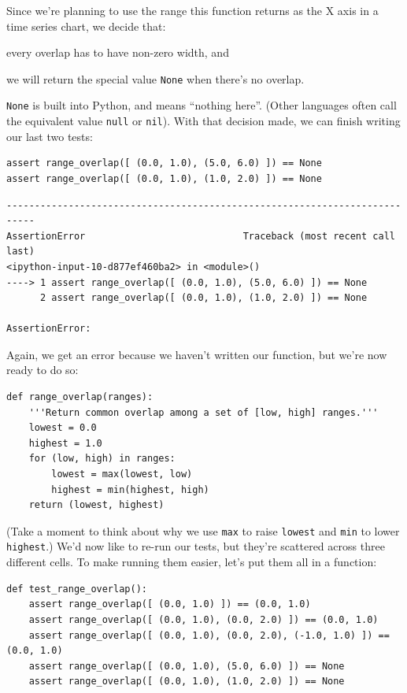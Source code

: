 \documentclass{book}
\begin{document}
Since we're planning to use the range this function returns as the X
axis in a time series chart, we decide that:

\begin{swcenumerate}
\item
  every overlap has to have non-zero width, and
\item
  we will return the special value \texttt{None} when there's no
  overlap.
\end{swcenumerate}

\texttt{None} is built into Python, and means ``nothing here''. (Other
languages often call the equivalent value \texttt{null} or
\texttt{nil}). With that decision made, we can finish writing our last
two tests:

\begin{verbatim}
assert range_overlap([ (0.0, 1.0), (5.0, 6.0) ]) == None
assert range_overlap([ (0.0, 1.0), (1.0, 2.0) ]) == None
\end{verbatim}

\begin{verbatim}
---------------------------------------------------------------------------
AssertionError                            Traceback (most recent call last)
<ipython-input-10-d877ef460ba2> in <module>()
----> 1 assert range_overlap([ (0.0, 1.0), (5.0, 6.0) ]) == None
      2 assert range_overlap([ (0.0, 1.0), (1.0, 2.0) ]) == None

AssertionError: 
\end{verbatim}

Again, we get an error because we haven't written our function, but
we're now ready to do so:

\begin{verbatim}
def range_overlap(ranges):
    '''Return common overlap among a set of [low, high] ranges.'''
    lowest = 0.0
    highest = 1.0
    for (low, high) in ranges:
        lowest = max(lowest, low)
        highest = min(highest, high)
    return (lowest, highest)
\end{verbatim}

(Take a moment to think about why we use \texttt{max} to raise
\texttt{lowest} and \texttt{min} to lower \texttt{highest}.) We'd now
like to re-run our tests, but they're scattered across three different
cells. To make running them easier, let's put them all in a function:

\begin{verbatim}
def test_range_overlap():
    assert range_overlap([ (0.0, 1.0) ]) == (0.0, 1.0)
    assert range_overlap([ (0.0, 1.0), (0.0, 2.0) ]) == (0.0, 1.0)
    assert range_overlap([ (0.0, 1.0), (0.0, 2.0), (-1.0, 1.0) ]) == (0.0, 1.0)
    assert range_overlap([ (0.0, 1.0), (5.0, 6.0) ]) == None
    assert range_overlap([ (0.0, 1.0), (1.0, 2.0) ]) == None
\end{verbatim}
\end{document}
